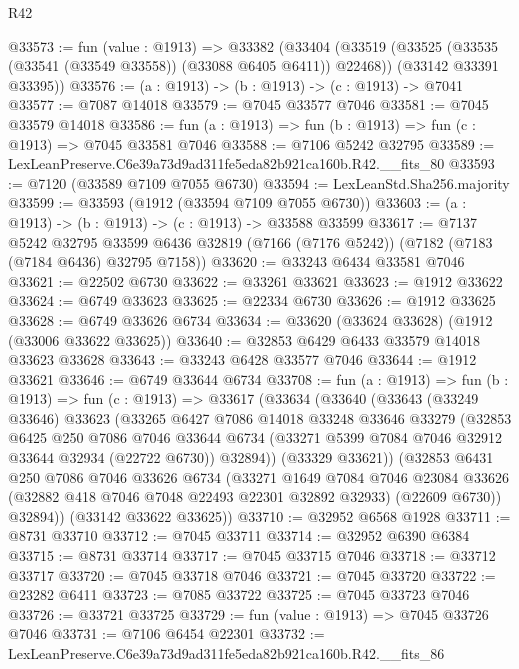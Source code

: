 \begin{lexlean}{R42}
\begin{coremodule}
{@33573 := fun (value : @1913) =>
  @33382
    (@33404
      (@33519 (@33525 (@33535 (@33541 (@33549 @33558)) (@33088 @6405 @6411)) @22468))
      (@33142 @33391 @33395))
@33576 := (a : @1913) -> (b : @1913) -> (c : @1913) -> @7041
@33577 := @7087 @14018
@33579 := @7045 @33577 @7046
@33581 := @7045 @33579 @14018
@33586 := fun (a : @1913) => fun (b : @1913) => fun (c : @1913) => @7045 @33581 @7046
@33588 := @7106 @5242 @32795
@33589 := LexLeanPreserve.C6e39a73d9ad311fe5eda82b921ca160b.R42.__fits_80
@33593 := @7120 (@33589 @7109 @7055 @6730)
@33594 := LexLeanStd.Sha256.majority
@33599 := @33593 (@1912 (@33594 @7109 @7055 @6730))
@33603 := (a : @1913) -> (b : @1913) -> (c : @1913) -> @33588 @33599
@33617 := @7137
    @5242
    @32795
    @33599
    @6436
    @32819
    (@7166 (@7176 @5242))
    (@7182 (@7183 (@7184 @6436) @32795 @7158))
@33620 := @33243 @6434 @33581 @7046
@33621 := @22502 @6730
@33622 := @33261 @33621
@33623 := @1912 @33622
@33624 := @6749 @33623
@33625 := @22334 @6730
@33626 := @1912 @33625
@33628 := @6749 @33626 @6734
@33634 := @33620 (@33624 @33628) (@1912 (@33006 @33622 @33625))
@33640 := @32853 @6429 @6433 @33579 @14018 @33623 @33628
@33643 := @33243 @6428 @33577 @7046
@33644 := @1912 @33621
@33646 := @6749 @33644 @6734
@33708 := fun (a : @1913) =>
  fun (b : @1913) =>
  fun (c : @1913) =>
  @33617
    (@33634
      (@33640
        (@33643
          (@33249 @33646)
          @33623
          (@33265
            @6427
            @7086
            @14018
            @33248
            @33646
            @33279
            (@32853
              @6425
              @250
              @7086
              @7046
              @33644
              @6734
              (@33271 @5399 @7084 @7046 @32912 @33644 @32934 (@22722 @6730))
              @32894))
          (@33329 @33621))
        (@32853
          @6431
          @250
          @7086
          @7046
          @33626
          @6734
          (@33271
            @1649
            @7084
            @7046
            @23084
            @33626
            (@32882 @418 @7046 @7048 @22493 @22301 @32892 @32933)
            (@22609 @6730))
          @32894))
      (@33142 @33622 @33625))
@33710 := @32952 @6568 @1928
@33711 := @8731 @33710
@33712 := @7045 @33711
@33714 := @32952 @6390 @6384
@33715 := @8731 @33714
@33717 := @7045 @33715 @7046
@33718 := @33712 @33717
@33720 := @7045 @33718 @7046
@33721 := @7045 @33720
@33722 := @23282 @6411
@33723 := @7085 @33722
@33725 := @7045 @33723 @7046
@33726 := @33721 @33725
@33729 := fun (value : @1913) => @7045 @33726 @7046
@33731 := @7106 @6454 @22301
@33732 := LexLeanPreserve.C6e39a73d9ad311fe5eda82b921ca160b.R42.__fits_86
}
\end{coremodule}
\end{lexlean}
